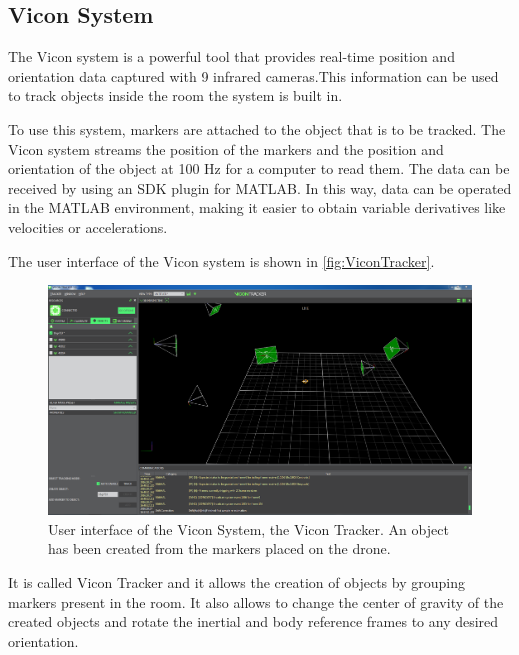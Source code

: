 \subsection{Vicon System}
The Vicon system is a powerful tool that provides real-time position and orientation data captured with 9 infrared cameras.This information can be used to track objects inside the room the system is built in.


To use this system, markers are attached to the object that is to be tracked. The Vicon system streams the position of the markers and the position and orientation of the object at 100 Hz for a computer to read them. The data can be received by using an SDK plugin for MATLAB. In this way, data can be operated in the MATLAB environment, making it easier to obtain variable derivatives like velocities or accelerations.

The user interface of the Vicon system is shown in \autoref{fig:ViconTracker}. 
\begin{figure}[H]
	\centering
	\includegraphics[scale=0.27]{figures/ViconTracker}
	\caption{User interface of the Vicon System, the Vicon Tracker. An object has been created from the markers placed on the drone.}
	\label{fig:ViconTracker}
\end{figure}
It is called Vicon Tracker and it allows the creation of objects by grouping markers present in the room. It also allows to change the center of gravity of the created objects and rotate the inertial and body reference frames to any desired orientation.